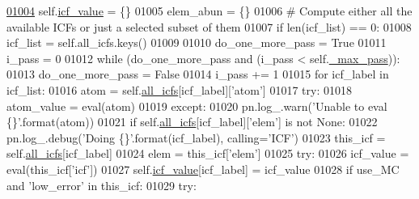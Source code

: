 \begin{DoxyCode}
\hypertarget{classpyneb_1_1core_1_1icf_1_1_i_c_f_l01004}{}\hyperlink{classpyneb_1_1core_1_1icf_1_1_i_c_f_a9dedc0eb2ad90ea08b8be9984e2d832b}{01004}         self.\hyperlink{classpyneb_1_1core_1_1icf_1_1_i_c_f_a9dedc0eb2ad90ea08b8be9984e2d832b}{icf\_value} = \{\}
01005         elem\_abun = \{\}
01006         \textcolor{comment}{# Compute either all the available ICFs or just a selected subset of them}
01007         \textcolor{keywordflow}{if} len(icf\_list) == 0:
01008             icf\_list = self.all\_icfs.keys()
01009 
01010         do\_one\_more\_pass = \textcolor{keyword}{True}
01011         i\_pass = 0
01012         \textcolor{keywordflow}{while} (do\_one\_more\_pass \textcolor{keywordflow}{and} (i\_pass < self.\hyperlink{classpyneb_1_1core_1_1icf_1_1_i_c_f_a994574a4b1fff9d0700fb483dabc8238}{\_max\_pass})):
01013             do\_one\_more\_pass = \textcolor{keyword}{False}
01014             i\_pass += 1
01015             \textcolor{keywordflow}{for} icf\_label \textcolor{keywordflow}{in} icf\_list:
01016                 atom = self.\hyperlink{classpyneb_1_1core_1_1icf_1_1_i_c_f_a854ee87a53feb102e429e902227ce88b}{all\_icfs}[icf\_label][\textcolor{stringliteral}{'atom'}]
01017                 \textcolor{keywordflow}{try}:
01018                     atom\_value = eval(atom)
01019                 \textcolor{keywordflow}{except}:
01020                     pn.log\_.warn(\textcolor{stringliteral}{'Unable to eval \{\}'}.format(atom))
01021                 \textcolor{keywordflow}{if} self.\hyperlink{classpyneb_1_1core_1_1icf_1_1_i_c_f_a854ee87a53feb102e429e902227ce88b}{all\_icfs}[icf\_label][\textcolor{stringliteral}{'elem'}] \textcolor{keywordflow}{is} \textcolor{keywordflow}{not} \textcolor{keywordtype}{None}:
01022                     pn.log\_.debug(\textcolor{stringliteral}{'Doing \{\}'}.format(icf\_label), calling=\textcolor{stringliteral}{'ICF'})
01023                     this\_icf = self.\hyperlink{classpyneb_1_1core_1_1icf_1_1_i_c_f_a854ee87a53feb102e429e902227ce88b}{all\_icfs}[icf\_label]
01024                     elem = this\_icf[\textcolor{stringliteral}{'elem'}]
01025                     \textcolor{keywordflow}{try}:
01026                         icf\_value = eval(this\_icf[\textcolor{stringliteral}{'icf'}])
01027                         self.\hyperlink{classpyneb_1_1core_1_1icf_1_1_i_c_f_a9dedc0eb2ad90ea08b8be9984e2d832b}{icf\_value}[icf\_label] = icf\_value
01028                         \textcolor{keywordflow}{if} use\_MC \textcolor{keywordflow}{and} \textcolor{stringliteral}{'low\_error'} \textcolor{keywordflow}{in} this\_icf:
01029                             \textcolor{keywordflow}{try}:

\end{DoxyCode}
